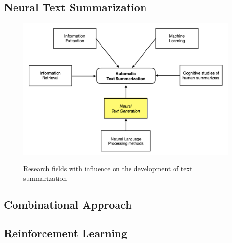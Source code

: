 \subsection{Neural Text Summarization}\label{ss:neuralgen}

\begin{figure}
	\begin{center}
		\includegraphics[width=5.5in]{photos/summ}\\
		\caption{Research fields with influence on the development of text summarization}\label{summ}
	\end{center}
\end{figure}

\subsection{Combinational Approach}

\subsection{Reinforcement Learning}
